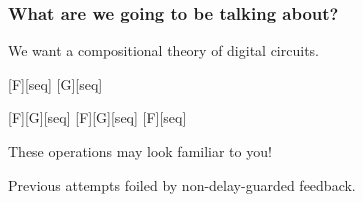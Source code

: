 \begin{frame}
    \frametitle{What are we going to be talking about?}

    \centering
    \LARGE
    We want a \alert{compositional} theory of digital circuits.

    \vspace{0.5em}

    \wait
    [F][seq]
    [G][seq]

    \vspace{0.5em}

    \wait
    [F][G][seq]
    \wait
    \quad
    [F][G][seq]
    \wait
    \quad
    [F][seq]

    \wait
    \vspace{0.5em}

    \normalsize
    These operations may look familiar to you!

    \wait

    Previous attempts foiled by \alert{non-delay-guarded feedback}.

\end{frame}

